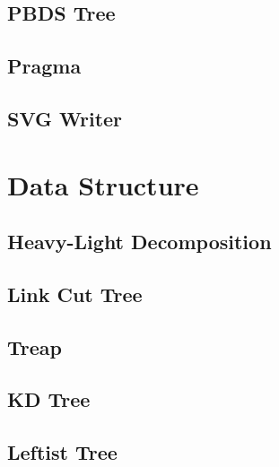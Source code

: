 \documentclass[a4paper,10pt,oneside]{article}
\begin{document}
\subsection{PBDS Tree}


\subsection{Pragma}


\subsection{SVG Writer}


\section{Data Structure}

\subsection{Heavy-Light Decomposition}


%

\subsection{Link Cut Tree}


\subsection{Treap}


\subsection{KD Tree}


\subsection{Leftist Tree}

\end{document}
